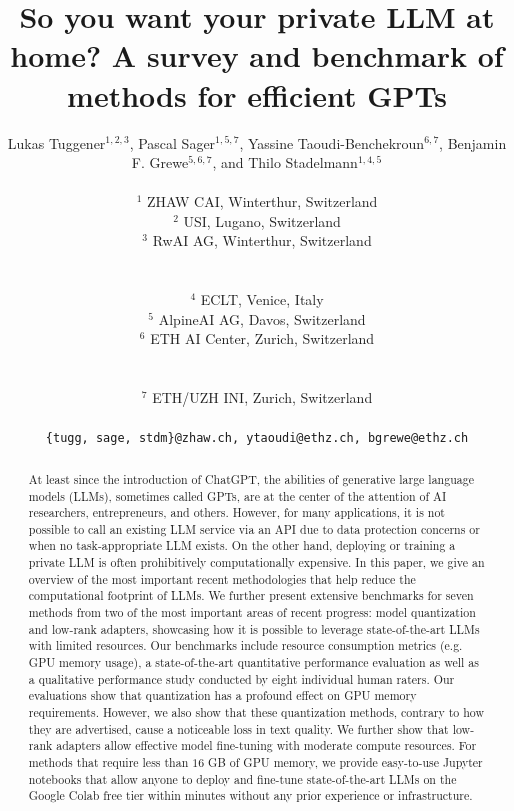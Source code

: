 \documentclass[conference]{IEEEtran}
\begin{document}
\title{So you want your private LLM at home? A survey and benchmark of methods for efficient GPTs 
}

\author{\hspace{-0.5cm}Lukas Tuggener$^{1,2,3}$, Pascal Sager$^{1,5,7}$, Yassine Taoudi-Benchekroun$^{6,7}$, Benjamin F. Grewe$^{5,6,7}$, and Thilo Stadelmann$^{1,4,5}$\\
\parbox{6.5 cm}{$^{1}$ ZHAW CAI, Winterthur, Switzerland} 
\parbox{4.5 cm}{$^{2}$ USI, Lugano, Switzerland}
\parbox{6 cm}{$^{3}$ RwAI AG, Winterthur, Switzerland}\\
\parbox{3.5 cm}{$^{4}$ ECLT, Venice, Italy}
\parbox{6 cm}{$^{5}$ AlpineAI AG, Davos, Switzerland} 
\parbox{6 cm}{$^{6}$ ETH AI Center, Zurich, Switzerland}\\
\parbox{6 cm}{$^{7}$ ETH/UZH INI, Zurich, Switzerland}\\
{\small{\texttt{\{tugg, sage, stdm\}@zhaw.ch, ytaoudi@ethz.ch, bgrewe@ethz.ch}}}
}%


\maketitle

\begin{abstract}
At least since the introduction of ChatGPT, the abilities of generative large language models (LLMs), sometimes called GPTs, are at the center of the attention of AI researchers, entrepreneurs, and others. However, for many applications, it is not possible to call an existing LLM service via an API due to data protection concerns or when no task-appropriate LLM exists. On the other hand,  deploying or training a private LLM is often prohibitively computationally expensive. In this paper, we give an overview of the most important recent methodologies that help reduce the computational footprint of LLMs. We further present extensive benchmarks for seven methods from two of the most important areas of recent progress: model quantization and low-rank adapters, showcasing how it is possible to leverage state-of-the-art LLMs with limited resources. Our benchmarks include resource consumption metrics (e.g. GPU memory usage), a state-of-the-art quantitative performance evaluation as well as a qualitative performance study conducted by eight individual human raters. Our evaluations show that quantization has a profound effect on GPU memory requirements. However, we also show that these quantization methods, contrary to how they are advertised, cause a noticeable loss in text quality. We further show that low-rank adapters allow effective model fine-tuning with moderate compute resources. For methods that require less than $16$ GB of GPU memory, we provide easy-to-use Jupyter notebooks that allow anyone to deploy and fine-tune state-of-the-art LLMs on the Google Colab free tier within minutes without any prior experience or infrastructure.
\end{abstract}
\end{document}
